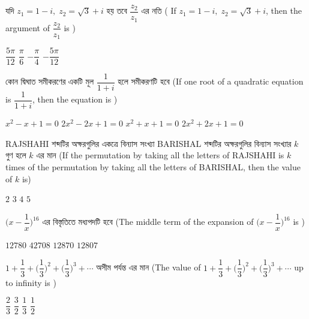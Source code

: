 \documentclass[addpoints]{exam}
\begin{document}
\begin{questions}
\begin{oneparchoices}
\end{oneparchoices}

\question   যদি $z_{1}=1-i, \; z_{2} = \sqrt{3} +i $ হয় তবে $ \dfrac{z_{2}}{z_{1}} $ এর নতি ( If $z_{1}=1-i, \; z_{2} = \sqrt{3} +i $, then the argument of $ \dfrac{z_{2}}{z_{1}} $ is )

\begin{oneparchoices}
\choice $ \dfrac{5\pi}{12} $
\choice $ \dfrac{\pi}{6} $
\choice $ -\dfrac{\pi}{4} $
\choice $ -\dfrac{5\pi}{12} $

\end{oneparchoices}


\question  কোন দ্বিঘাত সমীকরণের একটি মূল $ \dfrac{1}{1+i} $ হলে সমীকরণটি হবে (If one root of a quadratic equation is $\dfrac{1}{1+i}$, then the equation is )

\begin{oneparchoices}
\choice $ x^2 -x +1=0 $
\choice $ 2x^2 -2x +1=0 $
\choice $ x^2 +x +1=0 $
\choice $ 2x^2 +2x +1=0 $

\end{oneparchoices}

\question  RAJSHAHI শব্দটির অক্ষরগুলির একত্রে বিন্যাস সংখ্যা BARISHAL শব্দটির অক্ষরগুলির বিন্যাস সংখ্যার $ k $ গুণ হলে $ k $ এর মান (If the permutation by taking all the letters of RAJSHAHI is $ k $ times of the permutation by taking all the letters of BARISHAL, then the value of $ k $ is)

\begin{oneparchoices}
\choice $ 2$
\choice $ 3$
\choice $ 4$
\choice $ 5$

\end{oneparchoices}

\question  $ \Big(x-\dfrac{1}{x}\Big)^{16} $  এর  বিস্তৃতিতে মধ্যপদটি হবে (The middle term of the expansion of $ \Big(x-\dfrac{1}{x}\Big)^{16} $ is )

\begin{oneparchoices}
\choice $ 12780 $
\choice $ 42708 $
\choice $ 12870 $
\choice $ 12807 $

\end{oneparchoices}

\question $ 1+\dfrac{1}{3} + \Big( \dfrac{1}{3}\Big)^2+ \Big( \dfrac{1}{3}\Big)^3 +\cdots $  অসীম পর্যন্ত এর মান (The value of $ 1+\dfrac{1}{3} + \Big( \dfrac{1}{3}\Big)^2+ \Big( \dfrac{1}{3}\Big)^3 +\cdots $ up to infinity is )

\begin{oneparchoices}
\choice $ \dfrac{2}{3} $
\choice $ \dfrac{3}{2} $
\choice $ \dfrac{1}{3} $
\choice $ \dfrac{1}{2} $


\end{oneparchoices}
\end{questions}
\end{document}
